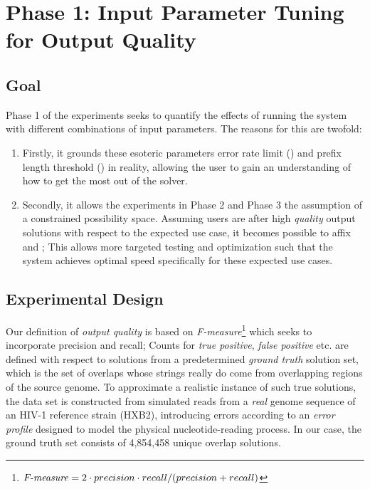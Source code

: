 \section{Phase 1: Input Parameter Tuning for Output Quality}
\label{phase1}

\subsection{Goal}
Phase 1 of the experiments seeks to quantify the effects of running the system with different combinations of input parameters. The reasons for this are twofold:

\begin{enumerate}
\item Firstly, it grounds these esoteric parameters \gls{error rate} limit () and prefix length threshold () in reality, allowing the user to gain an understanding of how to get the most out of the solver.

\item Secondly, it allows the experiments in Phase 2 and Phase 3 the assumption of a constrained possibility space. Assuming users are after high \textit{quality} output solutions with respect to the expected use case, it becomes possible to affix  and ; This allows more targeted testing and optimization such that the system achieves optimal speed specifically for these expected use cases.
\end{enumerate}

\subsection{Experimental Design}
Our definition of \textit{output quality} is based on \textit{F-measure}\footnote{$\text{\textit{F-measure}} = 2 \cdot{} precision \cdot{} recall / (precision + recall)$} which seeks to incorporate precision and recall; Counts for \textit{true positive}, \textit{false positive} etc. are  defined with respect to \glspl{solution} from a predetermined \textit{ground truth} solution set, which is the set of overlaps whose strings really do come from overlapping regions of the \gls{source genome}. To approximate a realistic instance of such true solutions, the data set is constructed from simulated reads from a \textit{real} genome sequence of an HIV-1 reference strain (HXB2), introducing errors according to an \textit{error profile} designed to model the physical nucleotide-reading process. In our case, the ground truth set consists of 4,854,458 unique overlap \glspl{solution}.

